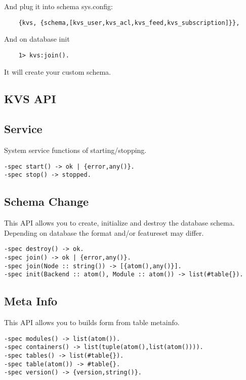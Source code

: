 And plug it into schema sys.config:

\begin{lstlisting}
    {kvs, {schema,[kvs_user,kvs_acl,kvs_feed,kvs_subscription]}},
\end{lstlisting}

And on database init

\begin{lstlisting}
    1> kvs:join().
\end{lstlisting}

It will create your custom schema.

\subsection*{KVS API}

\subsection*{Service}
System service functions of starting/stopping.

\vspace{1\baselineskip}
\begin{lstlisting}
-spec start() -> ok | {error,any()}.
-spec stop() -> stopped.
\end{lstlisting}
\vspace{1\baselineskip}

\subsection{Schema Change}
This API allows you to create, initialize and destroy the database schema.
Depending on database the format and/or featureset may differ.

\vspace{1\baselineskip}
\begin{lstlisting}
-spec destroy() -> ok.
-spec join() -> ok | {error,any()}.
-spec join(Node :: string()) -> [{atom(),any()}].
-spec init(Backend :: atom(), Module :: atom()) -> list(#table{}).
\end{lstlisting}
\vspace{1\baselineskip}

\subsection{Meta Info}
This API allows you to builds form from table metainfo.

\vspace{1\baselineskip}
\begin{lstlisting}
-spec modules() -> list(atom()).
-spec containers() -> list(tuple(atom(),list(atom()))).
-spec tables() -> list(#table{}).
-spec table(atom()) -> #table{}.
-spec version() -> {version,string()}.
\end{lstlisting}
\vspace{1\baselineskip}


